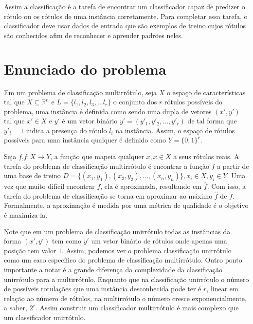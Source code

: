 Assim a classificação é a tarefa de encontrar um classificador capaz de predizer 
o rótulo ou os rótulos de uma instância corretamente.
Para completar essa tarefa, o classificador deve usar dados de entrada que são exemplos
de treino cujos rótulos são conhecidos afim de
reconhecer e aprender padrões neles.

\section{Enunciado do problema}

Em um problema de classificação multirrótulo, seja $X$ o espaço de características tal que
$X\subseteq \mathbb{R}^n$ e $L=\{l_1,l_2,l_3,...l_r\}$ o conjunto dos $r$ rótulos possíveis do problema,
uma instância é definida como sendo uma dupla de vetores $(x',y')$ tal que $x'\in X$ e $y'$ é um vetor binário
$y'=(y'_1,y'_2,...,y'_r)$ de tal forma que $y'_i=1$ indica a presença do rótulo $l_i$ na instância.
Assim, o espaço de rótulos possíveis para uma instância qualquer é definido como $Y=\{0,1\}^r$.


Seja $f$,$f : X \rightarrow Y$, a função que mapeia qualquer $x,x \in X$ a seus rótulos reais.
A tarefa do problema de classificação multirrótulo é encontrar a função $f$
a partir de uma base de treino $D=\{(x_1,y_1),(x_2,y_2),...,(x_n,y_n)\}, x_i\in X, y_i\in Y$.
Uma vez que muito difícil encontrar $f$, ela é aproximada, resultando em $\hat{f}$.
Com isso, a tarefa do problema de classificação se torna em aproximar ao máximo $\hat{f}$ de $f$.
Formalmente, a aproximação é medida por uma métrica de qualidade é o objetivo é maximiza-la.



Note que em um problema de classificação unirrótulo todas as instâncias da forma $(x',y')$ tem como $y'$
um vetor binário de rótulos onde apenas uma posição tem valor $1$. Assim, podemos ver o problema classificação
unirrótulo como um caso específico do problema de classificação multirrótulo.
Outro ponto importante a notar é a grande diferença da complexidade da classificação unirrótulo para a multirrótulo.
Enquanto que na classificação unirrótulo o número de possíveis rotulações que uma instância desconhecida pode ter é
$r$, linear em relação ao número de rótulos, na multirrótulo o número cresce exponencialmente, a saber, $2^r$.
Assim construir um classificador multirrótulo é mais complexo que um classificador unirrótulo.

